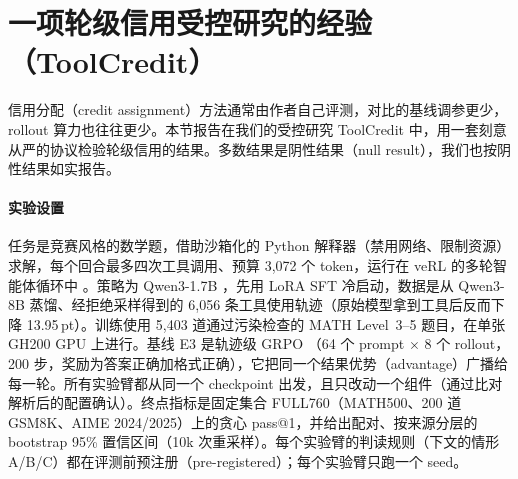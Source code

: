 \section{一项轮级信用受控研究的经验（ToolCredit）}\label{sec:toolcredit}

信用分配（credit assignment）方法通常由作者自己评测，对比的基线调参更少，rollout 算力也往往更少。本节报告在我们的受控研究 ToolCredit 中，用一套刻意从严的协议检验轮级信用的结果。多数结果是阴性结果（null result），我们也按阴性结果如实报告。

\paragraph{实验设置}
任务是竞赛风格的数学题，借助沙箱化的 Python 解释器（禁用网络、限制资源）求解，每个回合最多四次工具调用、预算 3{,}072 个 token，运行在 veRL 的多轮智能体循环中 \citep{sheng2025hybridflow}。策略为 Qwen3-1.7B \citep{yang2025qwen3}，先用 LoRA \citep{hu2022lora} SFT 冷启动，数据是从 Qwen3-8B 蒸馏、经拒绝采样得到的 6{,}056 条工具使用轨迹（原始模型拿到工具后反而下降 13.95\,pt）。训练使用 5{,}403 道通过污染检查的 MATH Level~3--5 题目，在单张 GH200 GPU 上进行。基线 E3 是轨迹级 GRPO \citep{shao2024deepseekmath}（64 个 prompt $\times$ 8 个 rollout，200 步，奖励为答案正确加格式正确），它把同一个结果优势（advantage）广播给每一轮。所有实验臂都从同一个 checkpoint 出发，且只改动一个组件（通过比对解析后的配置确认）。终点指标是固定集合 FULL760（MATH500、200 道 GSM8K、AIME 2024/2025）上的贪心 pass@1，并给出配对、按来源分层的 bootstrap 95\% 置信区间（10k 次重采样）。每个实验臂的判读规则（下文的情形 A/B/C）都在评测前预注册（pre-registered）；每个实验臂只跑一个 seed。

